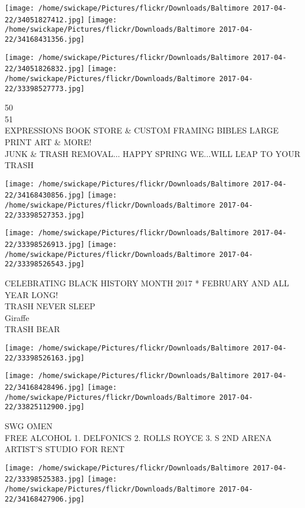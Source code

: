 \documentclass[10pt,letterpaper]{article}
\begin{document}
\texttt{[image: /home/swickape/Pictures/flickr/Downloads/Baltimore 2017-04-22/34051827412.jpg]}
\texttt{[image: /home/swickape/Pictures/flickr/Downloads/Baltimore 2017-04-22/34168431356.jpg]}

\texttt{[image: /home/swickape/Pictures/flickr/Downloads/Baltimore 2017-04-22/34051826832.jpg]}
\texttt{[image: /home/swickape/Pictures/flickr/Downloads/Baltimore 2017-04-22/33398527773.jpg]}

50\\
51\\
EXPRESSIONS BOOK STORE \& CUSTOM FRAMING BIBLES LARGE PRINT ART \& MORE!\\
JUNK \& TRASH REMOVAL... HAPPY SPRING WE...WILL LEAP TO YOUR TRASH
\pagebreak

\texttt{[image: /home/swickape/Pictures/flickr/Downloads/Baltimore 2017-04-22/34168430856.jpg]}
\texttt{[image: /home/swickape/Pictures/flickr/Downloads/Baltimore 2017-04-22/33398527353.jpg]}

\texttt{[image: /home/swickape/Pictures/flickr/Downloads/Baltimore 2017-04-22/33398526913.jpg]}
\texttt{[image: /home/swickape/Pictures/flickr/Downloads/Baltimore 2017-04-22/33398526543.jpg]}

CELEBRATING BLACK HISTORY MONTH 2017 * FEBRUARY AND ALL YEAR LONG!\\
TRASH NEVER SLEEP\\
Giraffe\\
TRASH BEAR
\pagebreak

\texttt{[image: /home/swickape/Pictures/flickr/Downloads/Baltimore 2017-04-22/33398526163.jpg]}

\vspace{0.25in}
\texttt{[image: /home/swickape/Pictures/flickr/Downloads/Baltimore 2017-04-22/34168428496.jpg]}
\texttt{[image: /home/swickape/Pictures/flickr/Downloads/Baltimore 2017-04-22/33825112900.jpg]}

SWG OMEN\\
FREE ALCOHOL 1. DELFONICS 2. ROLLS ROYCE 3. S 2ND ARENA\\
ARTIST'S STUDIO FOR RENT
\pagebreak

\texttt{[image: /home/swickape/Pictures/flickr/Downloads/Baltimore 2017-04-22/33398525383.jpg]}
\texttt{[image: /home/swickape/Pictures/flickr/Downloads/Baltimore 2017-04-22/34168427906.jpg]}
\end{document}
